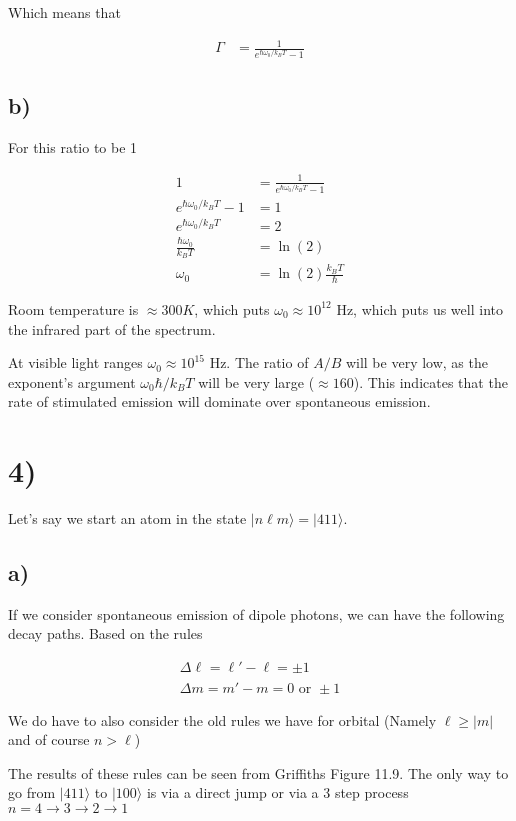 \documentclass{article}
\newcommand{\bra}[1]{|#1\rangle}
\begin{document}
Which means that

\begin{align*}
    \Gamma&=\frac{1}{e^{\hbar\omega_0/k_BT}-1}
\end{align*}

\subsection*{b)}
For this ratio to be 1

\begin{align*}
    1&=\frac{1}{e^{\hbar\omega_0/k_BT}-1}\\[1em]
    {e^{\hbar\omega_0/k_BT}-1}&=1\\[1em]
    {e^{\hbar\omega_0/k_BT}}&=2\\[1em]
    \frac{\hbar\omega_0}{k_BT}&=\ln(2)\\[1em]
    \omega_0&=\ln(2)\frac{k_BT}{\hbar}  
\end{align*}

Room temperature is $\approx300K$, which puts $\omega_0\approx10^{12}\text{ Hz}$, which puts us well into the infrared part of the spectrum.

At visible light ranges $\omega_0\approx10^{15}\text{ Hz}$. The ratio of $A/B$ will be very low, as the exponent's argument $\omega_0\hbar/k_BT$ will be very large ($\approx160$). This indicates that the rate of stimulated emission will dominate over spontaneous emission.

\section*{4)}
Let's say we start an atom in the state $|n\ell{m}\rangle=|411\rangle$.

\subsection*{a)}
If we consider spontaneous emission of dipole photons, we can have the following decay paths. Based on the rules

\begin{align*}
    \Delta\ell_{}=\ell'-\ell=\pm1\\[1em]
    \Delta{m}=m'-m=0\text{ or }\pm1
\end{align*}

We do have to also consider the old rules we have for orbital (Namely $\ell\geq{|m|}$ and of course $n>\ell$)

The results of these rules can be seen from Griffiths Figure 11.9. The only way to go from $\bra{411}$ to $\bra{100}$ is via a direct jump or via a 3 step process $n=4\rightarrow3\rightarrow2\rightarrow1$
\end{document}
